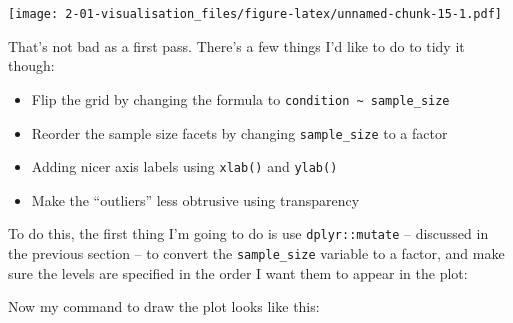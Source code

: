 \documentclass[]{book}
\newenvironment{Shaded}{\begin{snugshade}}{\end{snugshade}}
\newcommand{\CommentTok}[1]{\textcolor[rgb]{0.56,0.35,0.01}{\textit{#1}}}
\newcommand{\DataTypeTok}[1]{\textcolor[rgb]{0.13,0.29,0.53}{#1}}
\newcommand{\FloatTok}[1]{\textcolor[rgb]{0.00,0.00,0.81}{#1}}
\newcommand{\KeywordTok}[1]{\textcolor[rgb]{0.13,0.29,0.53}{\textbf{#1}}}
\newcommand{\NormalTok}[1]{#1}
\newcommand{\OperatorTok}[1]{\textcolor[rgb]{0.81,0.36,0.00}{\textbf{#1}}}
\newcommand{\StringTok}[1]{\textcolor[rgb]{0.31,0.60,0.02}{#1}}
\providecommand{\tightlist}{%
  \setlength{\itemsep}{0pt}\setlength{\parskip}{0pt}}
\begin{document}
\texttt{[image: 2-01-visualisation\_files/figure-latex/unnamed-chunk-15-1.pdf]}

That's not bad as a first pass. There's a few things I'd like to do to tidy it though:

\begin{itemize}
\tightlist
\item
  Flip the grid by changing the formula to \texttt{condition\ \textasciitilde{}\ sample\_size}
\item
  Reorder the sample size facets by changing \texttt{sample\_size} to a factor
\item
  Adding nicer axis labels using \texttt{xlab()} and \texttt{ylab()}
\item
  Make the ``outliers'' less obtrusive using transparency
\end{itemize}

To do this, the first thing I'm going to do is use \texttt{dplyr::mutate} -- discussed in the previous section -- to convert the \texttt{sample\_size} variable to a factor, and make sure the levels are specified in the order I want them to appear in the plot:

\begin{Shaded}
\end{Shaded}

Now my command to draw the plot looks like this:

\begin{Shaded}
\end{Shaded}
\end{document}
